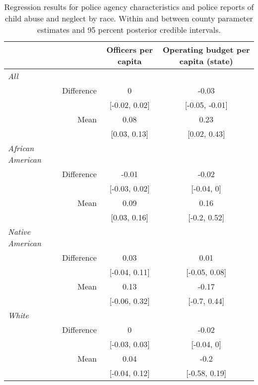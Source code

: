 \begin{table}[ht]
\centering
\caption{Regression results for police agency characteristics and police reports of child abuse and neglect by race. Within and between county parameter estimates and 95 percent posterior credible intervals.} 
\begin{tabular}{lrcc}
  \hline
  &   & Officers per capita & Operating budget per capita (state) \\ 
  \hline
{\textit{All}} &  &  &  \\ 
   & Difference & 0 & -0.03 \\ 
   &  & [-0.02, 0.02] & [-0.05, -0.01] \\ 
   & Mean & 0.08 & 0.23 \\ 
   &  & [0.03, 0.13] & [0.02, 0.43] \\ 
  {\textit{African American}} &  &  &  \\ 
   & Difference & -0.01 & -0.02 \\ 
   &  & [-0.03, 0.02] & [-0.04, 0] \\ 
   & Mean & 0.09 & 0.16 \\ 
   &  & [0.03, 0.16] & [-0.2, 0.52] \\ 
  {\textit{Native American}} &  &  &  \\ 
   & Difference & 0.03 & 0.01 \\ 
   &  & [-0.04, 0.11] & [-0.05, 0.08] \\ 
   & Mean & 0.13 & -0.17 \\ 
   &  & [-0.06, 0.32] & [-0.7, 0.44] \\ 
  {\textit{White}} &  &  &  \\ 
   & Difference & 0 & -0.02 \\ 
   &  & [-0.03, 0.03] & [-0.04, 0] \\ 
   & Mean & 0.04 & -0.2 \\ 
   &  & [-0.04, 0.12] & [-0.58, 0.19] \\ 
   \hline
\end{tabular}
\end{table}
